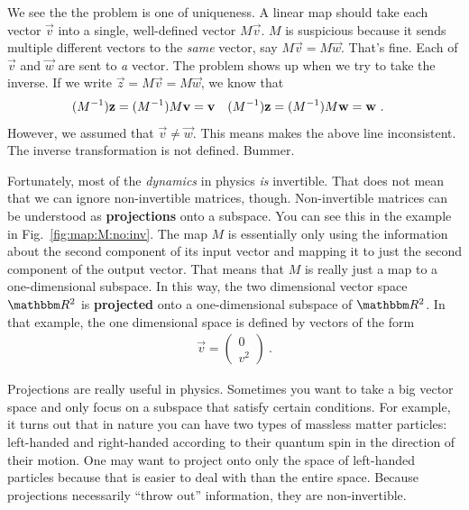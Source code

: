 \documentclass[12pt, oneside]{report}    %
\begin{document}
% 
We see the the problem is one of uniqueness. A linear map should take each vector $\vec{v}$ into a single, well-defined vector $M\vec{v}$. $M$ is suspicious because it sends multiple different vectors to the \emph{same} vector, say $M\vec{v} = M\vec{w}$. That's fine. Each of $\vec{v}$ and $\vec{w}$ are sent to \emph{a} vector. The problem shows up when we try to take the inverse. If we write $\vec{z} = M\vec{v} = M\vec{w}$, we know that
\begin{align}
    (M^{-1})\mathbf{z} = (M^{-1})M\mathbf{v} &= \mathbf{v}
    &
    (M^{-1})\mathbf{z} = (M^{-1})M\mathbf{w} &= \mathbf{w} \ .
\end{align}
However, we assumed that $\vec{v} \neq \vec{w}$. This means makes the above line inconsistent. The inverse transformation is not defined. Bummer.

Fortunately, most of the \emph{dynamics} in physics \emph{is} invertible. That does not mean that we can ignore non-invertible matrices, though. Non-invertible matrices can be understood as \textbf{projections} onto a subspace. You can see this in the example in Fig.~\ref{fig:map:M:no:inv}. The map $M$ is essentially only using the information about the second component of its input vector and mapping it to just the second component of the output vector. That means that $M$ is really just a map to a one-dimensional subspace. In this way, the two dimensional vector space $\RR ^2$ is \textbf{projected} onto a one-dimensional subspace of $\RR ^2$. In that example, the one dimensional space is defined by vectors of the form
\begin{align}
    \vec{v} = 
    \begin{pmatrix}
    0\\ v^2    
    \end{pmatrix} \ .
\end{align}

Projections are really useful in physics. Sometimes you want to take a big vector space and only focus on a subspace that satisfy certain conditions. For example, it turns out that in nature you can have two types of massless matter particles: left-handed and right-handed according to their quantum spin in the direction of their motion. One may want to project onto only the space of left-handed particles because that is easier to deal with than the entire space. Because projections necessarily ``throw out'' information, they are non-invertible.
\end{document}
